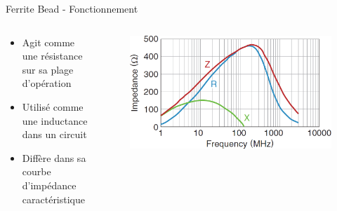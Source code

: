 \begin{frame}{Ferrite Bead - Fonctionnement}
    \begin{columns}
        \begin{column}{0.6\textwidth}
            \begin{itemize}
                \item Agit comme une résistance sur sa plage d'opération
                \item Utilisé comme une inductance dans un circuit
                \item Diffère dans sa courbe d'impédance caractéristique
            \end{itemize}
        \end{column}

        \begin{column}{0.4\textwidth}
            \begin{figure}
                \includegraphics[width=\textwidth, height=0.75\textheight, keepaspectratio]{pictures/ferrite-bead-impedance-curve.png}
            \end{figure}
        \end{column}
    \end{columns}


    \pause
    \vspace{-48pt}
    \begin{columns}
    \begin{column}{0.7\textwidth}
        \begin{center}
\end{center}
\end{column}
\end{columns}
\end{frame}
